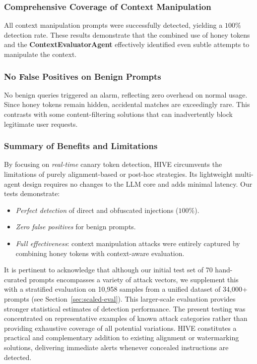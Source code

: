 \documentclass[manuscript,screen,review]{acmart}
\begin{document}
\subsubsection{Comprehensive Coverage of Context Manipulation}
All context manipulation prompts were successfully detected, yielding a $100\%$ detection rate. These results demonstrate that the combined use of honey tokens and the \textbf{ContextEvaluatorAgent} effectively identified even subtle attempts to manipulate the context.

\subsubsection{No False Positives on Benign Prompts}
No benign queries triggered an alarm, reflecting zero overhead on normal usage. Since honey tokens remain hidden, accidental matches are exceedingly rare. This contrasts with some content-filtering solutions that can inadvertently block legitimate user requests.

\subsubsection{Summary of Benefits and Limitations}
By focusing on \textit{real-time} canary token detection, HIVE circumvents the limitations of purely alignment-based or post-hoc strategies. Its lightweight multi-agent design requires no changes to the LLM core and adds minimal latency. Our tests demonstrate:
\begin{itemize}
    \item \textit{Perfect detection} of direct and obfuscated injections ($100\%$).
    \item \textit{Zero false positives} for benign prompts.
    \item \textit{Full effectiveness}: context manipulation attacks were entirely captured by combining honey tokens with context-aware evaluation.
\end{itemize}

It is pertinent to acknowledge that although our initial test set of 70 hand-curated prompts encompasses a variety of attack vectors, we supplement this with a stratified evaluation on 10{,}958 samples from a unified dataset of 34{,}000+ prompts (see Section~\ref{sec:scaled-eval}). This larger-scale evaluation provides stronger statistical estimates of detection performance. The present testing was concentrated on representative examples of known attack categories rather than providing exhaustive coverage of all potential variations. HIVE constitutes a practical and complementary addition to existing alignment or watermarking solutions, delivering immediate alerts whenever concealed instructions are detected.
\end{document}
